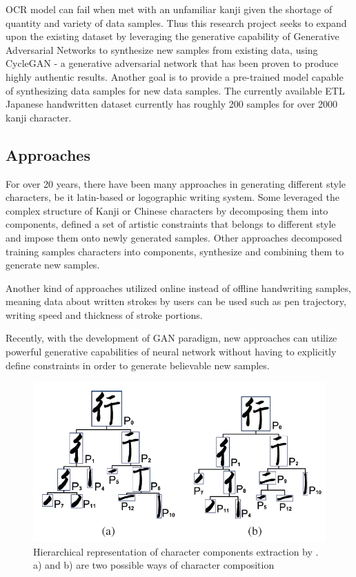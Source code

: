 \documentclass[12pt]{report}
\begin{document}
OCR model can fail when met with an unfamiliar kanji given the shortage of quantity and variety of data
samples. Thus this research project seeks to expand upon the existing dataset by
leveraging the generative capability of Generative Adversarial Networks to
synthesize new samples from existing data, using CycleGAN - a generative adversarial network
that has been proven to produce highly authentic results. Another goal is to provide
a pre-trained model capable of synthesizing data samples for new data samples.
The currently available ETL Japanese handwritten dataset currently has roughly 200
samples for over 2000 kanji character.

\subsection{Approaches}
For over 20 years, there have been many approaches in generating different style characters, be it latin-based or logographic writing system.
Some leveraged the complex structure of Kanji or Chinese characters by decomposing them into components, defined a set of artistic constraints that belongs to different style and impose them onto newly generated samples. Other approaches decomposed training samples characters into components, synthesize and combining them to generate new samples.

Another kind of approaches utilized online instead of offline handwriting samples, meaning data about written strokes by users can be used such as pen trajectory, writing speed and thickness of stroke portions.

Recently, with the development of GAN paradigm, new approaches can utilize powerful generative capabilities of neural network without having to explicitly define constraints in order to generate believable new samples.

\begin{figure}[h]
	\centering
	\includegraphics[scale=0.7]{hierarch-comp}
	\caption{Hierarchical representation of character components extraction by \cite{handwritten-font}. a) and b) are two possible ways of character composition}
	\label{fig:hierarch-comp}
\end{figure}
\end{document}
